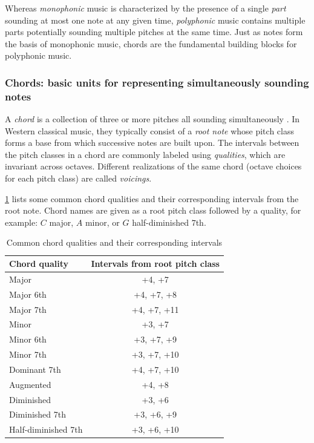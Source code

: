 Whereas \emph{monophonic} music is characterized by the presence of a single
\emph{part} sounding at most one note at any given time, \emph{polyphonic}
music contains multiple parts potentially sounding multiple pitches at the same
time. Just as notes form the basis of monophonic music, chords are the fundamental
building blocks for polyphonic music.

\subsubsection{Chords: basic units for representing simultaneously sounding notes}

A \emph{chord} is a collection of three or more pitches all sounding
simultaneously \citep{randel1999harvard}. In Western classical music, they
typically consist of a \emph{root note} whose pitch class forms a base from
which successive notes are built upon. The intervals between the pitch classes
in a chord are commonly labeled using \emph{qualities}, which are invariant
across octaves. Different realizations of the same chord (\eg octave choices
for each pitch class) are called \emph{voicings}.

\cref{tab:chord-qualities} lists some common chord qualities and their
corresponding intervals from the root note. Chord names are given as a root
pitch class followed by a quality, for example: $C$ major, $A$ minor, or $G$
half-diminished $7$th.

\begin{table}[htpb]
    \centering
    \begin{tabular}{lc}
        \toprule
        Chord quality & Intervals from root pitch class \\
        \midrule
        Major & +4, +7 \\
        Major 6th & +4, +7, +8 \\
        Major 7th & +4, +7, +11 \\
        Minor & +3, +7 \\
        Minor 6th & +3, +7, +9 \\
        Minor 7th & +3, +7, +10 \\
        Dominant 7th & +4, +7, +10 \\
        Augmented & +4, +8 \\
        Diminished & +3, +6 \\
        Diminished 7th & +3, +6, +9 \\
        Half-diminished 7th & +3, +6, +10 \\
        \bottomrule
    \end{tabular}
    \caption{Common chord qualities and their corresponding intervals \citep{freedman2015correlational}}
    \label{tab:chord-qualities}
\end{table}

